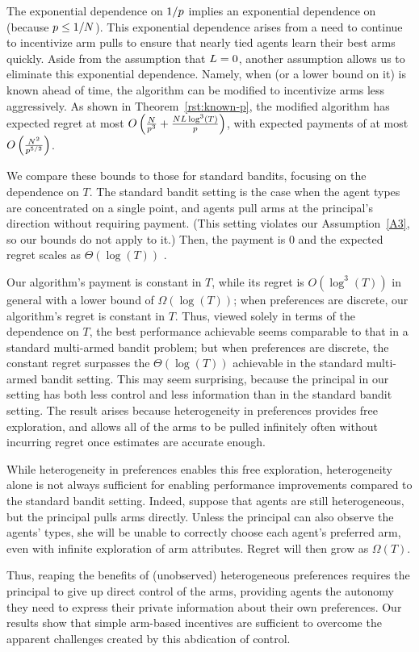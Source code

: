 The exponential dependence on $1/p$ implies an exponential
dependence on \ARMNUM (because $p \leq 1/N$).
This exponential dependence arises from a need to continue to
incentivize arm pulls to ensure that nearly tied agents learn their
best arms quickly.
Aside from the assumption that $L = 0$,
another assumption allows us to eliminate this exponential dependence.
Namely, when \MinProb (or a lower bound on it) is known ahead of time,
the algorithm can be modified to incentivize arms less aggressively.
As shown in Theorem~\ref{rst:known-p},
the modified algorithm has expected regret at most
$O \left(\frac{N}{p^3}
+\frac{N L \log^3(T)}{p} \right)$,
with expected payments of at most
$O \left(\frac{N^2}{p^{5/2}} \right)$.

We compare these bounds to those for standard bandits,
focusing on the dependence on $T$.  
The standard bandit setting is the case when the agent types \AgV
are concentrated on a single point, and agents pull arms at the
principal's direction without requiring payment.
(This setting violates our Assumption~\ref{A3},
so our bounds do not apply to it.)
Then, the payment is $0$ and the expected regret scales as
$\Theta(\log(T))$ \cite[Theorem 2.1]{bubeck2012regret}.

Our algorithm's payment is constant in $T$,
while its regret is $O(\log^3(T))$ in general with a lower bound of
$\Omega(\log(T))$;
when preferences are discrete, our algorithm's regret is
constant in $T$.
Thus, viewed solely in terms of the dependence on $T$,
the best performance achievable seems comparable to that in a standard
multi-armed bandit problem;
but when preferences are discrete, the constant regret
surpasses the $\Theta(\log(T))$ achievable in the standard multi-armed
bandit setting.
This may seem surprising, because the principal in our setting has
both less control and less information than in the standard bandit setting.
The result arises because heterogeneity in preferences provides
free exploration, and allows all of the arms to be pulled infinitely
often without incurring regret once estimates are accurate enough.

While heterogeneity in preferences enables this free exploration,
heterogeneity alone is not always sufficient for enabling performance
improvements compared to the standard bandit setting.
Indeed, suppose that agents are still heterogeneous,
but the principal pulls arms directly.
Unless the principal can also observe the agents' types,
she will be unable to correctly choose each agent's preferred arm,
even with infinite exploration of arm attributes.
Regret will then grow as $\Omega(T)$. 

Thus, reaping the benefits of (unobserved) heterogeneous preferences
requires the principal to give up direct control of the arms,
providing agents the autonomy they need to express their private
information about their own preferences.
Our results show that simple arm-based incentives are sufficient
to overcome the apparent challenges created by this abdication of
control.
